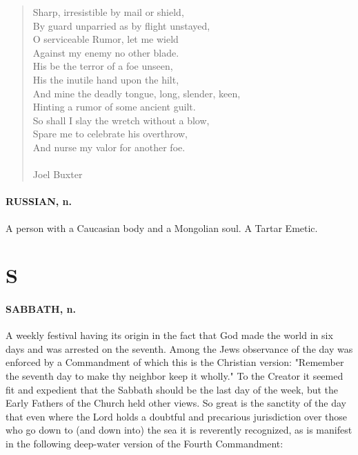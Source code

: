 \documentclass[11pt]{article}
\begin{document}
\begin{quote}   Sharp, irresistible by mail or shield, \\
      By guard unparried as by flight unstayed, \\
  O serviceable Rumor, let me wield \\
      Against my enemy no other blade. \\
  His be the terror of a foe unseen, \\
      His the inutile hand upon the hilt, \\
  And mine the deadly tongue, long, slender, keen, \\
      Hinting a rumor of some ancient guilt. \\
  So shall I slay the wretch without a blow, \\
  Spare me to celebrate his overthrow, \\
  And nurse my valor for another foe. \\
 \\
Joel Buxter \end{quote}


\paragraph{RUSSIAN, n.}  A person with a Caucasian body and a Mongolian soul.  A
Tartar Emetic.



\section*{S}



\paragraph{SABBATH, n.}  A weekly festival having its origin in the fact that God
made the world in six days and was arrested on the seventh.  Among the
Jews observance of the day was enforced by a Commandment of which this
is the Christian version:  "Remember the seventh day to make thy
neighbor keep it wholly."  To the Creator it seemed fit and expedient
that the Sabbath should be the last day of the week, but the Early
Fathers of the Church held other views.  So great is the sanctity of
the day that even where the Lord holds a doubtful and precarious
jurisdiction over those who go down to (and down into) the sea it is
reverently recognized, as is manifest in the following deep-water
version of the Fourth Commandment:
\end{document}
